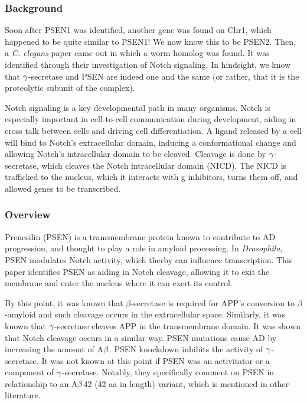 \subsubsection*{Background}

Soon after PSEN1 was identified, another gene was found on Chr1, which happened to be quite similar to PSEN1! We now know this to be PSEN2. Then, a \textit{C. elegans} paper came out in which a worm homolog was found. It was identified through their investigation of Notch signaling. In hindsight, we know that $\gamma$-secretase and PSEN are indeed one and the same (or rather, that it is the proteolytic subunit of the complex).\newline

Notch signaling is a key developmental path in many organisms. Notch is especially important in cell-to-cell communication during development, aiding in cross talk between cells and driving cell differentiation. A ligand released by a cell will bind to Notch's extracellular domain, inducing a conformational change and allowing Notch's intracellular domain to be cleaved. Cleavage is done by $\gamma$-secretase, which cleaves the Notch intracellular domain (NICD). The NICD is trafficked to the nucleus, which it interacts with g inhibitors, turns them off, and allowed genes to be transcribed. 

\subsubsection*{Overview}

Prenesilin (PSEN) is a transmembrane protein known to contribute to AD progression, and thought to play a role in amyloid processing. In \textit{Drosophila}, PSEN modulates Notch activity, which therby can influence transcription. This paper identifies PSEN as aiding in Notch cleavage, allowing it to exit the membrane and enter the nucleus where it can exert its control.\newline

By this point, it was known that $\beta$-secretase is required for APP's conversion to $\beta$-amyloid and such cleavage occurs in the extracellular space. Similarly, it was known that $\gamma$-secretase cleaves APP in the transmembrane domain. It was shown that Notch cleavage occurs in a similar way. PSEN mutations cause AD by increasing the amount of A$\beta$. PSEN knockdown inhibits the activity of $\gamma$-secretase. It was not known at this point if PSEN was an activitator or a component of $\gamma$-secretase. Notably, they specifically comment on PSEN in relationship to an A$\beta$42 (42 aa in length) variant, which is mentioned in other literature. 

